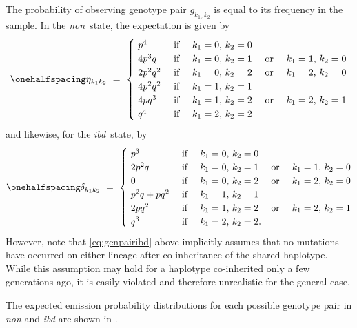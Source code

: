The probability of observing genotype pair ${g_{k_1,k_2}}$ is equal to its frequency in the sample.
In the \emph{non}~state, the expectation is given by
\begin{equation}\label{eq:genpairnon}\onehalfspacing
	\eta_{k_1 k_2} ~=~
  \begin{cases}
		~ p^4       & ~ \text{if ~~ $k_1 = 0$, $k_2 = 0$} \\
    ~ 4 p^3 q   & ~ \text{if ~~ $k_1 = 0$, $k_2 = 1$ ~~ or ~~ $k_1 = 1$, $k_2 = 0$} \\
    ~ 2 p^2 q^2 & ~ \text{if ~~ $k_1 = 0$, $k_2 = 2$ ~~ or ~~ $k_1 = 2$, $k_2 = 0$} \\
    ~ 4 p^2 q^2 & ~ \text{if ~~ $k_1 = 1$, $k_2 = 1$} \\
    ~ 4 p q^3   & ~ \text{if ~~ $k_1 = 1$, $k_2 = 2$ ~~ or ~~ $k_1 = 2$, $k_2 = 1$} \\
    ~ q^4       & ~ \text{if ~~ $k_1 = 2$, $k_2 = 2$}
  \end{cases}
\end{equation}
and likewise, for the \emph{ibd}~state, by
\begin{equation}\label{eq:genpairibd}\onehalfspacing
	\delta_{k_1 k_2} ~=~
  \begin{cases}
		~ p^3           & ~ \text{if ~~ $k_1 = 0$, $k_2 = 0$} \\
    ~ 2 p^2 q       & ~ \text{if ~~ $k_1 = 0$, $k_2 = 1$ ~~ or ~~ $k_1 = 1$, $k_2 = 0$} \\
    ~ 0             & ~ \text{if ~~ $k_1 = 0$, $k_2 = 2$ ~~ or ~~ $k_1 = 2$, $k_2 = 0$} \\
    ~ p^2 q + p q^2 & ~ \text{if ~~ $k_1 = 1$, $k_2 = 1$} \\
    ~ 2 p q^2       & ~ \text{if ~~ $k_1 = 1$, $k_2 = 2$ ~~ or ~~ $k_1 = 2$, $k_2 = 1$} \\
    ~ q^3           & ~ \text{if ~~ $k_1 = 2$, $k_2 = 2$} \text{.}
  \end{cases}
\end{equation}
However, note that \cref{eq:genpairibd} above implicitly assumes that no mutations have occurred on either lineage after co-inheritance of the shared haplotype.
While this assumption may hold for a haplotype co-inherited only a few generations ago, it is easily violated and therefore unrealistic for the general case.

The expected emission probability distributions for each possible genotype pair in \emph{non} and \emph{ibd} are shown in .

%

%



